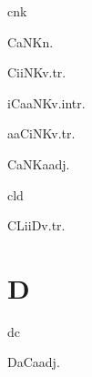 \begin{multicols*}{2}
\begin{dictroot}{c}{nk}
    \begin{dictentry}{CaNK}{n.}
    \end{dictentry}
    \begin{dictentry}{CiiNK}{v.tr.}
    \end{dictentry}
    \begin{dictentry}{iCaaNK}{v.intr.}
    \end{dictentry}
    \begin{dictentry}{aaCiNK}{v.tr.}
    \end{dictentry}
    \begin{dictentry}{CaNKa}{adj.}
    \end{dictentry}
\end{dictroot}

\begin{dictroot}{cl}{d}
    \begin{dictentry}{CLiiD}{v.tr.}
    \end{dictentry}
\end{dictroot}

\section*{D}

\begin{dictroot}{d}{c}
    \begin{dictentry}{DaCa}{adj.}
    \end{dictentry}
\end{dictroot}


\end{multicols*}

